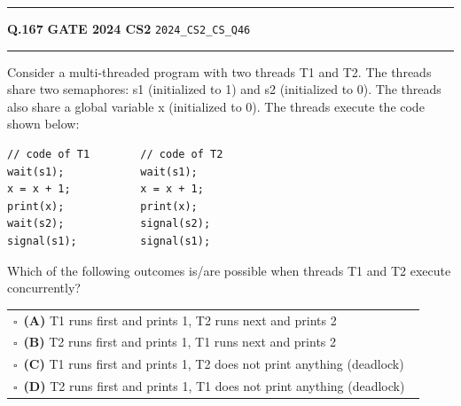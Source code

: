 \documentclass[a4paper,10pt]{article}
\begin{document}
\vspace{6pt}\hrule height 0.35pt\vspace{6pt}
\noindent
\begin{tcolorbox}[
    blanker,
    sidebyside,
    sidebyside align=top,
    lefthand width=0.55\textwidth,
    top=4pt, bottom=4pt, left=0pt, right=0pt,
    middle=16pt,
    underlay={
        \draw[dashed, black!80, line width=0.8pt, dash pattern=on 4pt off 3pt]
            ([xshift=0.55\textwidth+8pt]frame.north west) --
            ([xshift=0.55\textwidth+8pt]frame.south west);
    }
]
\textbf{Q.167}  \hfill {\footnotesize\textbf{GATE 2024 CS2} \quad \tiny\texttt{2024\_CS2\_CS\_Q46}}
\vspace{2pt}\hrule height 0.3pt\vspace{4pt}

Consider a multi-threaded program with two threads T1 and T2. The threads share two semaphores: s1 (initialized to 1) and s2 (initialized to 0). The threads also share a global variable x (initialized to 0). The threads execute the code shown below:
\begin{verbatim}
// code of T1        // code of T2
wait(s1);            wait(s1);
x = x + 1;           x = x + 1;
print(x);            print(x);
wait(s2);            signal(s2);
signal(s1);          signal(s1);
\end{verbatim}
Which of the following outcomes is/are possible when threads T1 and T2 execute concurrently?

\par\vspace{6pt}\noindent
\begin{tabular}{@{}p{0.98\linewidth}@{}}
$\square$\ \textbf{(A)} T1 runs first and prints 1, T2 runs next and prints 2 \\
\addlinespace[3pt]
$\square$\ \textbf{(B)} T2 runs first and prints 1, T1 runs next and prints 2 \\
\addlinespace[3pt]
$\square$\ \textbf{(C)} T1 runs first and prints 1, T2 does not print anything (deadlock) \\
\addlinespace[3pt]
$\square$\ \textbf{(D)} T2 runs first and prints 1, T1 does not print anything (deadlock)
\end{tabular}

\tcblower


\end{tcolorbox}
\end{document}
